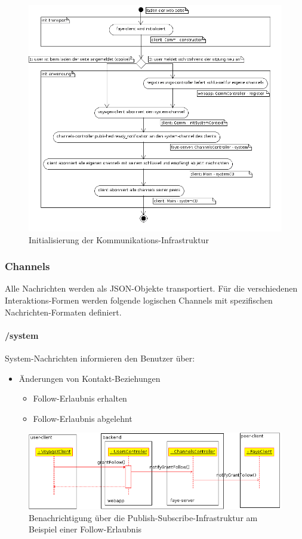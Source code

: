   \begin{figure}[H]
      \centering
	  \includegraphics[scale=0.5]{bilder/uml/register.png}
  	  \caption{Initialisierung der Kommunikations-Infrastruktur}
  \end{figure}


\subsubsection{Channels}
Alle Nachrichten werden als JSON-Objekte transportiert. Für die verschiedenen Interaktions-Formen werden folgende logischen Channels mit spezifischen Nachrichten-Formaten definiert.
\paragraph{/system}
System-Nachrichten informieren den Benutzer über:
\begin{itemize}
	\item Änderungen von Kontakt-Beziehungen
	\begin{itemize}
		\item Follow-Erlaubnis erhalten
		\item Follow-Erlaubnis abgelehnt
	\end{itemize}
\end{itemize}

  \begin{figure}[H]
      \centering
	  \includegraphics[scale=0.7]{bilder/uml/grantFollow.png}
  	  \caption{Benachrichtigung über die Publish-Subscribe-Infrastruktur am Beispiel einer Follow-Erlaubnis}
  \end{figure}

